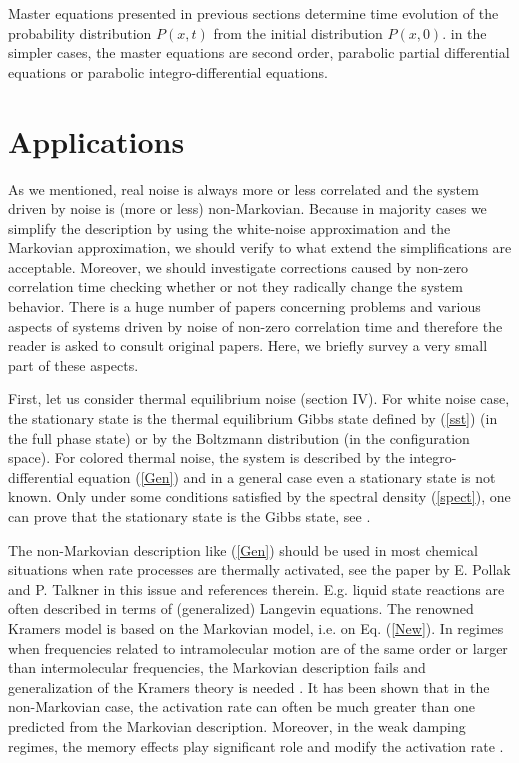 \documentclass[authoryear,draft,1p,times]{elsarticle}
\renewcommand{\=}{\stackrel{\mathrm{d}}{=}}
\begin{document}
Master equations presented in previous sections determine time evolution of the probability distribution $P(x, t)$ from the initial distribution $P(x, 0)$.  
in the simpler cases, the master equations are second order, parabolic   partial differential equations  or 
parabolic integro-differential equations.    








\section{Applications}

As we  mentioned,  real noise is always more or less correlated 
and the system driven by noise is (more or less) non-Markovian. 
Because in majority cases we simplify the description by using 
the white-noise approximation and the Markovian approximation, 
we  should verify to what extend  
 the simplifications are acceptable.  Moreover,  we should  
investigate corrections caused by non-zero correlation time  
checking whether or not they radically change the system  behavior. 
There is a huge number of papers concerning problems and 
various aspects of  systems driven by noise of 
non-zero correlation time and therefore  the reader is asked to consult 
original papers. Here,  we briefly survey a very small part of 
these aspects. 
 
First, let us consider thermal equilibrium noise  (section IV). 
For white noise case,   
the stationary state is the thermal equilibrium Gibbs state 
defined by (\ref{sst}) (in the full phase state) or by 
the Boltzmann distribution (in the configuration space). 
For colored thermal noise, the system is described by the 
integro-differential equation (\ref{Gen}) 
and in a general case even a stationary state is not known. 
Only under some conditions satisfied by the spectral density (\ref{spect}), 
one can prove that the stationary state is the Gibbs state, see 
\cite{jak}.  

The non-Markovian description like (\ref{Gen}) should be used in most 
chemical situations 
when rate processes are thermally activated, 
see the paper by E. Pollak and P. Talkner in  this issue and 
references therein.  
E.g. liquid state reactions are often described in terms of (generalized) 
Langevin equations. The renowned Kramers model is based on the 
Markovian model, 
i.e. on Eq. (\ref{New}). In regimes when frequencies related to  
intramolecular motion are of the same order or larger than intermolecular 
frequencies, the Markovian description fails and generalization of the 
Kramers theory is needed \cite{straub86,pol,bor}. It has been shown that  
in the non-Markovian case, 
the activation rate can often be much greater than 
one predicted from the Markovian description. 
Moreover, in the weak damping regimes,  the memory effects play 
significant role and modify the activation rate \cite{bor}. 
\end{document}
